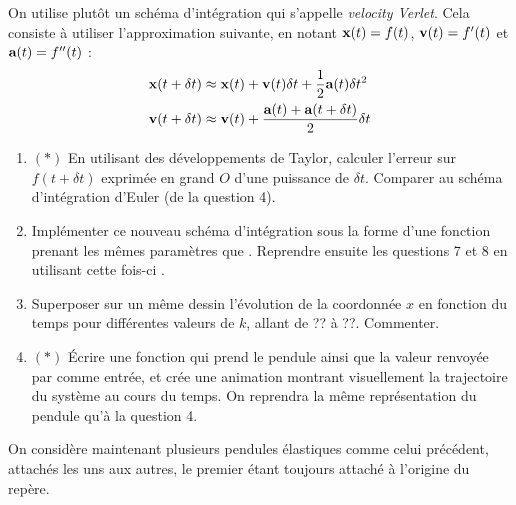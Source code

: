 \documentclass{article}
\begin{document}
On utilise plutôt un schéma d'intégration qui s'appelle \textit{velocity Verlet}. Cela consiste à utiliser l'approximation suivante, en notant $\textbf x(t) = f(t)$, $\textbf v(t) = f'(t)$ et $\textbf a(t) = f''(t)$ :
\[\begin{split}
	\textbf x(t + \delta t) &\approx \textbf x(t) + \textbf v(t)\delta t + \frac12 \textbf a(t)\delta t^2\\
	\textbf v(t + \delta t) &\approx \textbf v(t) + \frac{\textbf a(t) + \textbf a(t+\delta t)}2\delta t
\end{split}\]

\begin{enumerate}[resume]
	\item $(*)$ En utilisant des développements de Taylor, calculer l'erreur sur $f(t+\delta t)$ exprimée en grand $O$ d'une puissance de $\delta t$. Comparer au schéma d'intégration d'Euler (de la question 4).
	\item Implémenter ce nouveau schéma d'intégration sous la forme d'une fonction  prenant les mêmes paramètres que . Reprendre ensuite les questions 7 et 8 en utilisant cette fois-ci .
	\item Superposer sur un même dessin l'évolution de la coordonnée $x$ en fonction du temps pour différentes valeurs de $k$, allant de ?? à ??. Commenter.
	\item $(*)$ Écrire une fonction  qui prend le pendule ainsi que la valeur renvoyée par  comme entrée, et crée une animation montrant visuellement la trajectoire du système au cours du temps. On reprendra la même représentation du pendule qu'à la question 4.
\end{enumerate}

On considère maintenant plusieurs pendules élastiques comme celui précédent, attachés les uns aux autres, le premier étant toujours attaché à l'origine du repère.
\end{document}
